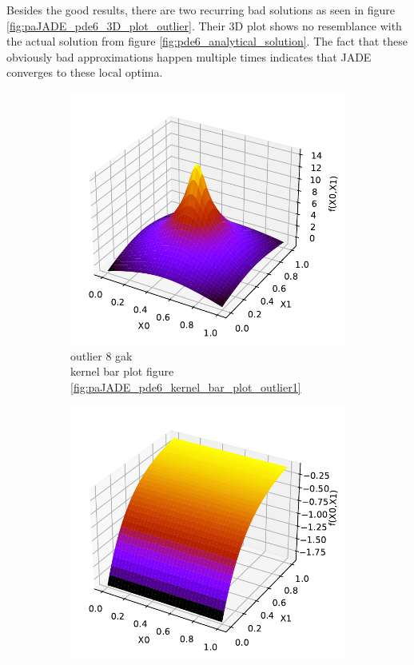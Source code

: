 \documentclass[./\jobname.tex]{subfiles}
\begin{document}
Besides the good results, there are two recurring bad solutions as seen in figure \ref{fig:paJADE_pde6_3D_plot_outlier}. Their 3D plot shows no resemblance with the actual solution from figure \ref{fig:pde6_analytical_solution}. The fact that these obviously bad approximations happen multiple times indicates that JADE converges to these local optima. 

\begin{figure}[H]
	\centering
	\begin{subfigure}[b]{0.333\linewidth}
		\centering
		\includegraphics[width=1\textwidth]{../../code/experiments/experiment_2/pde6_3D_plot_outlier1.pdf}
		\caption{outlier 8 \gls{gak}\\ kernel bar plot figure \ref{fig:paJADE_pde6_kernel_bar_plot_outlier1}}
		\label{fig:pajade_pde6_3D_plot_outlier1}
	\end{subfigure}%
	\begin{subfigure}[b]{0.333\linewidth}
		\centering
		\includegraphics[width=1\textwidth]{../../code/experiments/experiment_2/pde6_3D_plot_outlier2.pdf}

\end{subfigure}
\end{figure}
\end{document}
